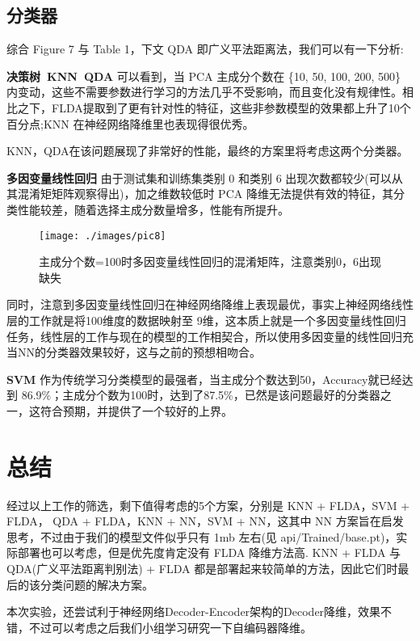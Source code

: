 \documentclass[fleqn]{Paquetes/RevDigMatEduInt}
\begin{document}
\subsection{分类器}

综合 Figure 7 与 Table 1，下文 QDA 即广义平法距离法，我们可以有一下分析:

\textcolor{azulTitulos}{\bfseries 决策树\ KNN\ QDA} 可以看到，当 PCA 主成分个数在 \{10, 50, 100, 200, 500\} 内变动，这些不需要参数进行学习的方法几乎不受影响，而且变化没有规律性。相比之下，FLDA提取到了更有针对性的特征，这些非参数模型的效果都上升了10个百分点;KNN 在神经网络降维里也表现得很优秀。

KNN，QDA在该问题展现了非常好的性能，最终的方案里将考虑这两个分类器。

\textcolor{azulTitulos}{\bfseries 多因变量线性回归} 由于测试集和训练集类别 0 和类别 6 出现次数都较少(可以从其混淆矩矩阵观察得出)，加之维数较低时 PCA 降维无法提供有效的特征，其分类性能较差，随着选择主成分数量增多，性能有所提升。
\begin{figure}[ht!!!]
	\centering
	\texttt{[image: ./images/pic8]}
	\caption{主成分个数=100时多因变量线性回归的混淆矩阵，注意类别0，6出现缺失}
\end{figure}

同时，注意到多因变量线性回归在神经网络降维上表现最优，事实上神经网络线性层的工作就是将100维度的数据映射至 9维，这本质上就是一个多因变量线性回归任务，线性层的工作与现在的模型的工作相契合，所以使用多因变量的线性回归充当NN的分类器效果较好，这与之前的预想相吻合。

\textcolor{azulTitulos}{\bfseries SVM} 作为传统学习分类模型的最强者，当主成分个数达到50，Accuracy就已经达到 86.9\%；主成分个数为100时，达到了87.5\%，已然是该问题最好的分类器之一，这符合预期，并提供了一个较好的上界。

\section{总结}

经过以上工作的筛选，剩下值得考虑的5个方案，分别是 KNN + FLDA，SVM + FLDA， QDA + FLDA，KNN + NN，SVM + NN，这其中 NN 方案旨在启发思考，不过由于我们的模型文件似乎只有 1mb 左右(见 api/Trained/base.pt)，实际部署也可以考虑，但是优先度肯定没有 FLDA 降维方法高. KNN + FLDA 与 QDA(广义平法距离判别法) + FLDA 都是部署起来较简单的方法，因此它们时最后的该分类问题的解决方案。

本次实验，还尝试利于神经网络Decoder-Encoder架构的Decoder降维，效果不错，不过可以考虑之后我们小组学习研究一下自编码器降维。
\end{document}
